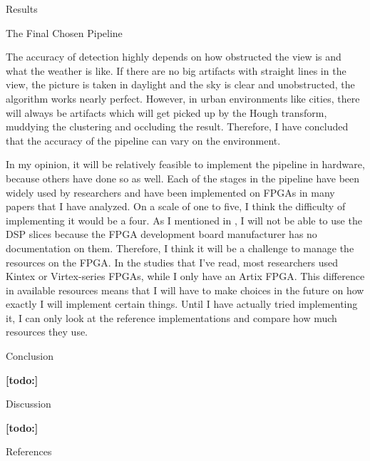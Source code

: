 \documentclass{matthijs}
\begin{document}
\begin{hoofdstuk}{Results}
\begin{paragraaf}{The Final Chosen Pipeline}
			\bigskip

			The accuracy of detection highly depends on how obstructed the view is and what the weather is like.
			If there are no big artifacts with straight lines in the view, the picture is taken in daylight and the sky is clear and unobstructed, the algorithm works nearly perfect.
			However, in urban environments like cities, there will always be artifacts which will get picked up by the Hough transform, muddying the clustering and occluding the result.
			Therefore, I have concluded that the accuracy of the pipeline can vary on the environment.

			\bigskip

			In my opinion, it will be relatively feasible to implement the pipeline in hardware, because others have done so as well.
			Each of the stages in the pipeline have been widely used by researchers and have been implemented on FPGAs in many papers that I have analyzed.
			On a scale of one to five, I think the difficulty of implementing it would be a four.
			As I mentioned in , I will not be able to use the DSP slices because the FPGA development board manufacturer has no documentation on them.
			Therefore, I think it will be a challenge to manage the resources on the FPGA.
			In the studies that I've read, most researchers used Kintex or Virtex-series FPGAs, while I only have an Artix FPGA.
			This difference in available resources means that I will have to make choices in the future on how exactly I will implement certain things.
			Until I have actually tried implementing it, I can only look at the reference implementations and compare how much resources they use.

		\end{paragraaf}

	\end{hoofdstuk}

	\begin{hoofdstuk}{Conclusion}

		\textbf{[todo:]}

	\end{hoofdstuk}

	\begin{hoofdstuk}{Discussion}

		\textbf{[todo:]}

	\end{hoofdstuk}

	\begin{hoofdstuk}{References}

		\printbibliography[heading=none]
	
	\end{hoofdstuk}

	\clearpage
	\thispagestyle{empty}
	\addtocounter{page}{-1}
	\
	\clearpage
\end{document}
